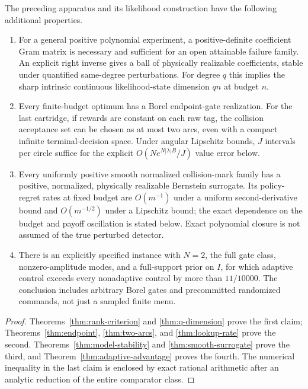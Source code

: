 \begin{theorem}\label{thm:strengthening}
The preceding apparatus and its likelihood construction have the following
additional properties.
\begin{enumerate}
\item For a general positive polynomial experiment, a positive-definite
coefficient Gram matrix is necessary and sufficient for an open attainable
failure family. An explicit right inverse gives a ball of physically
realizable coefficients, stable under quantified same-degree perturbations.
For degree $q$ this implies the sharp intrinsic continuous likelihood-state
dimension $qn$ at budget $n$.
\item Every finite-budget optimum has a Borel endpoint-gate realization.
For the last cartridge, if rewards are constant on each raw tag, the collision
acceptance set can be chosen as at most two arcs, even with a compact infinite
terminal-decision space. Under angular Lipschitz bounds, $J$ intervals per
circle suffice for the explicit $O(N e^{N|\lambda|B}/J)$ value error below.
\item Every uniformly positive smooth normalized collision-mark family has
a positive, normalized, physically realizable Bernstein surrogate. Its
policy-regret rates at fixed budget are $O(m^{-1})$ under a uniform
second-derivative bound and $O(m^{-1/2})$ under a Lipschitz bound; the exact
dependence on the budget and payoff oscillation is stated below.
Exact polynomial closure is not assumed of the true perturbed detector.
\item There is an explicitly specified instance with $N=2$, the full gate
class, nonzero-amplitude modes, and a full-support prior on $I$, for which
adaptive control exceeds every nonadaptive control by more than $11/10000$.
The conclusion includes arbitrary Borel gates and precommitted randomized
commands, not just a sampled finite menu.
\end{enumerate}
\end{theorem}
\begin{proof}
Theorems~\ref{thm:rank-criterion} and \ref{thm:q-dimension} prove the first
claim; Theorems~\ref{thm:endpoint}, \ref{thm:two-arcs}, and
\ref{thm:lookup-rate} prove the second. Theorems~\ref{thm:model-stability}
and \ref{thm:smooth-surrogate} prove the third, and
Theorem~\ref{thm:adaptive-advantage} proves the fourth. The numerical inequality
in the last claim is enclosed by exact rational arithmetic after an analytic
reduction of the entire comparator class.
\end{proof}

